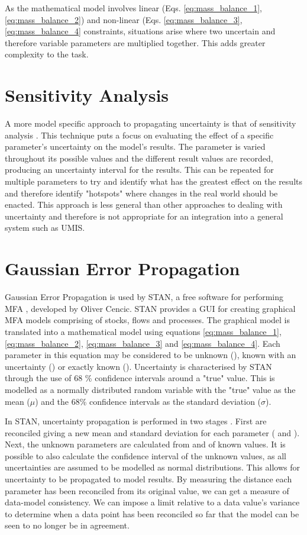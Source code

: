 \documentclass[ %
                    author={Tom Jager},
                supervisor={Dr. Daniel Schien},
                    degree={MEng},
                     title={A Bayesian Inference Engine for UMIS Structured Data},
                  subtitle={},
                      type={research},
                      year={2019} ]{dissertation}
\begin{document}
As the mathematical model involves linear (Eqs. \ref{eq:mass_balance_1}, \ref{eq:mass_balance_2}) and non-linear (Eqs. \ref{eq:mass_balance_3}, \ref{eq:mass_balance_4} constraints, situations arise where two uncertain and therefore variable parameters are multiplied together. This adds greater complexity to the task.

\section{Sensitivity Analysis}
A more model specific approach to propagating uncertainty is that of sensitivity analysis \cite{laner2014systematic}. This technique puts a focus on evaluating the effect of a specific parameter's uncertainty on the model's results. The parameter is varied throughout its possible values and the different result values are recorded, producing an uncertainty interval for the results. This can be repeated for multiple parameters to try and identify what has the greatest effect on the results and therefore identify "hotspots" where changes in the real world should be enacted. This approach is less general than other approaches to dealing with uncertainty and therefore is not appropriate for an integration into a general system such as UMIS.

\section{Gaussian Error Propagation}
Gaussian Error Propagation is used by STAN, a free software for performing MFA \cite{cencic2008material}, developed by Oliver Cencic. STAN provides a GUI for creating graphical MFA models comprising of stocks, flows and processes. The graphical model is translated into a mathematical model using equations \ref{eq:mass_balance_1}, \ref{eq:mass_balance_2}, \ref{eq:mass_balance_3} and \ref{eq:mass_balance_4}. Each parameter in this equation may be considered to be unknown (), known with an uncertainty ()  or exactly known (). Uncertainty is characterised by STAN through the use of 68 \% confidence intervals around a "true" value. This is modelled as a normally distributed random variable with the "true" value as the mean ($\mu$) and the 68\% confidence intervals as the standard deviation ($\sigma$).

In STAN, uncertainty propagation is performed in two stages \cite{cencic2016nonlinear}. First  are reconciled giving a new mean and standard deviation for each parameter (\pmb{$\mu^*$} and \pmb{$\sigma^*$}). Next, the unknown parameters are calculated from \pmb{$\mu^*$} and \pmb{$\sigma^*$} of known values. It is possible to also calculate the confidence interval of the unknown values, as all uncertainties are assumed to be modelled as normal distributions. This allows for uncertainty to be propagated to model results. By measuring the distance each parameter has been reconciled from its original value, we can get a measure of data-model consistency. We can impose a limit relative to a data value's variance to determine when a data point has been reconciled so far that the model can be seen to no longer be in agreement.
\end{document}
